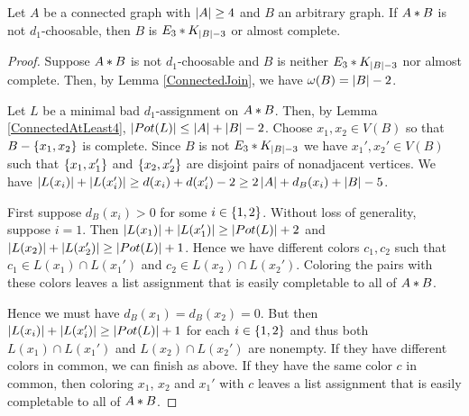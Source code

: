 \begin{lem}\label{ConnectedAtLeast4Poss}
Let $A$ be a connected graph with $\left|A\right| \geq 4$ and $B$ an arbitrary graph. If $A \mbox{\hspace{2 pt}$\ast$\hspace{2 pt}} B$ is not $d_1$-choosable, then $B$ is $E_3 \mbox{\hspace{2 pt}$\ast$\hspace{2 pt}} K_{\left|B\right| - 3}$ or almost complete.
\end{lem}
\begin{proof}
Suppose $A \mbox{\hspace{2 pt}$\ast$\hspace{2 pt}} B$ is not $d_1$-choosable and $B$ is neither $E_3 \mbox{\hspace{2 pt}$\ast$\hspace{2 pt}} K_{\left|B\right| - 3}$ nor almost complete. Then, by Lemma \ref{ConnectedJoin}, we have $\omega(B) = \left|B\right| - 2$. 

Let $L$ be a minimal bad $d_1$-assignment on $A \mbox{\hspace{2 pt}$\ast$\hspace{2 pt}} B$. Then, by Lemma \ref{ConnectedAtLeast4}, $\left|Pot(L)\right| \leq \left|A\right| + \left|B\right| - 2$.  Choose $x_1, x_2 \in V(B)$ so that $B - \left\{ x_1,x_2 \right\}$ is complete.  Since $B$ is not $E_3 \mbox{\hspace{2 pt}$\ast$\hspace{2 pt}} K_{\left|B\right| - 3}$ we have $x_1', x_2' \in V(B)$ such that $\left\{ x_1, x_1' \right\}$ and $\left\{ x_2, x_2' \right\}$ are disjoint pairs of nonadjacent vertices.  We have $\left|L(x_i)\right| + \left|L(x_i')\right| \geq d(x_i) + d(x_i') - 2 \geq 2\left|A\right| + d_B(x_i) + \left|B\right| - 5$.

First suppose $d_B(x_i) > 0$ for some $i \in \left\{ 1,2 \right\}$.  Without loss of generality, suppose $i=1$. Then $\left|L(x_1)\right| + \left|L(x_1')\right| \geq \left|Pot(L)\right| + 2$ and $\left|L(x_2)\right| + \left|L(x_2')\right| \geq \left|Pot(L)\right| + 1$.  Hence we have different colors $c_1, c_2$ such that $c_1 \in L(x_1) \cap L(x_1')$ and $c_2 \in L(x_2) \cap L(x_2')$.  Coloring the pairs with these colors leaves a list assignment that is easily completable to all of $A \mbox{\hspace{2 pt}$\ast$\hspace{2 pt}} B$.

Hence we must have $d_B(x_1) = d_B(x_2) = 0$.  But then $\left|L(x_i)\right| + \left|L(x_i')\right| \geq \left|Pot(L)\right| + 1$ for each $i \in \left\{ 1,2 \right\}$ and thus both $L(x_1) \cap L(x_1')$ and $L(x_2) \cap L(x_2')$ are nonempty.  If they have different colors in common, we can finish as above.  If they have the same color $c$ in common, then coloring $x_1$, $x_2$ and $x_1'$ with $c$ leaves a list assignment that is easily completable to all of $A \mbox{\hspace{2 pt}$\ast$\hspace{2 pt}} B$.
\end{proof}

